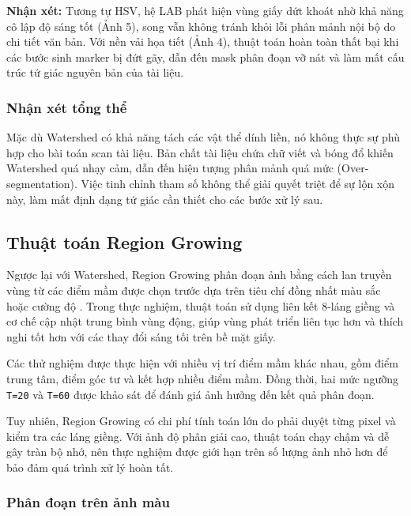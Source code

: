 \documentclass[12pt, a4paper]{report}
\begin{document}
\textbf{Nhận xét:} Tương tự HSV, hệ LAB phát hiện vùng giấy dứt khoát nhờ khả năng cô lập độ sáng tốt (Ảnh 5), song vẫn không tránh khỏi lỗi phân mảnh nội bộ do chi tiết văn bản. Với nền vải họa tiết (Ảnh 4), thuật toán hoàn toàn thất bại khi các bước sinh marker bị đứt gãy, dẫn đến mask phân đoạn vỡ nát và làm mất cấu trúc tứ giác nguyên bản của tài liệu.

\subsubsection{Nhận xét tổng thể}
Mặc dù Watershed có khả năng tách các vật thể dính liền, nó không thực sự phù hợp cho bài toán scan tài liệu. Bản chất tài liệu chứa chữ viết và bóng đổ khiến Watershed quá nhạy cảm, dẫn đến hiện tượng phân mảnh quá mức (Over-segmentation). Việc tinh chỉnh tham số không thể giải quyết triệt để sự lộn xộn này, làm mất định dạng tứ giác cần thiết cho các bước xử lý sau.



\subsection{Thuật toán Region Growing}

Ngược lại với Watershed, Region Growing phân đoạn ảnh bằng cách lan truyền vùng từ các điểm mầm được chọn trước dựa trên tiêu chí đồng nhất màu sắc hoặc cường độ \cite{gonzalez2018}. Trong thực nghiệm, thuật toán sử dụng liên kết 8-láng giềng và cơ chế cập nhật trung bình vùng động, giúp vùng phát triển liên tục hơn và thích nghi tốt hơn với các thay đổi sáng tối trên bề mặt giấy.

Các thử nghiệm được thực hiện với nhiều vị trí điểm mầm khác nhau, gồm điểm trung tâm, điểm góc tư và kết hợp nhiều điểm mầm. Đồng thời, hai mức ngưỡng \texttt{T=20} và \texttt{T=60} được khảo sát để đánh giá ảnh hưởng đến kết quả phân đoạn.

Tuy nhiên, Region Growing có chi phí tính toán lớn do phải duyệt từng pixel và kiểm tra các láng giềng. Với ảnh độ phân giải cao, thuật toán chạy chậm và dễ gây tràn bộ nhớ, nên thực nghiệm được giới hạn trên số lượng ảnh nhỏ hơn để bảo đảm quá trình xử lý hoàn tất.


\subsubsection{Phân đoạn trên ảnh màu}
\end{document}
